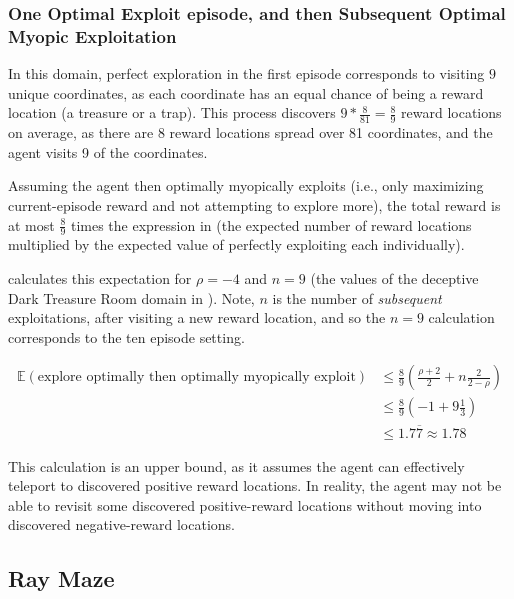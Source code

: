\documentclass{article}
\begin{document}
\FloatBarrier

\subsubsection{One Optimal Exploit episode, and then Subsequent Optimal Myopic Exploitation}

In this domain, perfect exploration in the first episode corresponds to visiting \(9\) unique coordinates, as each coordinate has an equal chance of being a reward location (a treasure or a trap). This process discovers \(9*\frac{8}{81} = \frac{8}{9}\) reward locations on average, as there are 8 reward locations spread over 81 coordinates, and the agent visits 9 of the coordinates.

Assuming the agent then optimally myopically exploits (i.e., only maximizing current-episode reward and not attempting to explore more), the total reward is at most \(\frac{8}{9}\) times the expression in  (the expected number of reward locations multiplied by the expected value of perfectly exploiting each individually).

 calculates this expectation for \(\rho=-4\) and \(n=9\) (the values of the deceptive Dark Treasure Room domain in ). Note, \(n\) is the number of \emph{subsequent} exploitations, after visiting a new reward location, and so the \(n=9\) calculation corresponds to the ten episode setting.

\begin{align}
\label{eqn:optimalcalc}
\mathbb{E}(\text{explore optimally then optimally myopically exploit}) &\leq \frac{8}{9}\left(\frac{\rho + 2}{2} + n\frac{2}{2-\rho}\right)\\
&\leq \frac{8}{9}(-1 + 9\frac{1}{3})\\
&\leq 1.7\overline{7} \approx 1.78
\end{align}

This calculation is an upper bound, as it assumes the agent can effectively teleport to discovered positive reward locations. In reality, the agent may not be able to revisit some discovered positive-reward locations without moving into discovered negative-reward locations.

\FloatBarrier
\clearpage
\pagebreak

\subsection{Ray Maze}
\label{sec:raymaze}
\end{document}
